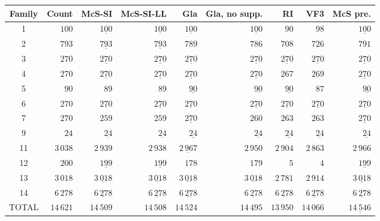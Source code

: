 
\begin{tabular}{crrrrrrrr}
    \toprule
    Family & Count & McS-SI & McS-SI-LL & Gla & Gla, no supp. & RI & VF3 & McS pre.\\
    \midrule

1 & $100$ & $\underline{100}$ & $\underline{100}$ & $\underline{100}$ & $\underline{100}$ & $90$ & $98$ & $\underline{100}$\\
2 & $793$ & $\underline{793}$ & $\underline{793}$ & $789$ & $786$ & $708$ & $726$ & $791$\\
3 & $270$ & $\underline{270}$ & $\underline{270}$ & $\underline{270}$ & $\underline{270}$ & $\underline{270}$ & $\underline{270}$ & $\underline{270}$\\
4 & $270$ & $\underline{270}$ & $\underline{270}$ & $\underline{270}$ & $\underline{270}$ & $267$ & $269$ & $\underline{270}$\\
5 & $90$ & $89$ & $89$ & $\underline{90}$ & $\underline{90}$ & $\underline{90}$ & $87$ & $\underline{90}$\\
6 & $270$ & $\underline{270}$ & $\underline{270}$ & $\underline{270}$ & $\underline{270}$ & $\underline{270}$ & $\underline{270}$ & $\underline{270}$\\
7 & $270$ & $259$ & $259$ & $\underline{270}$ & $260$ & $263$ & $263$ & $\underline{270}$\\
9 & $24$ & $\underline{24}$ & $\underline{24}$ & $\underline{24}$ & $\underline{24}$ & $\underline{24}$ & $\underline{24}$ & $\underline{24}$\\
11 & $3\,038$ & $2\,939$ & $2\,938$ & $\underline{2\,967}$ & $2\,950$ & $2\,904$ & $2\,863$ & $2\,966$\\
12 & $200$ & $\underline{199}$ & $\underline{199}$ & $178$ & $179$ & $5$ & $4$ & $\underline{199}$\\
13 & $3\,018$ & $\underline{3\,018}$ & $\underline{3\,018}$ & $\underline{3\,018}$ & $\underline{3\,018}$ & $2\,781$ & $2\,914$ & $\underline{3\,018}$\\
14 & $6\,278$ & $\underline{6\,278}$ & $\underline{6\,278}$ & $\underline{6\,278}$ & $\underline{6\,278}$ & $\underline{6\,278}$ & $\underline{6\,278}$ & $\underline{6\,278}$\\
TOTAL & $14\,621$ & $14\,509$ & $14\,508$ & $14\,524$ & $14\,495$ & $13\,950$ & $14\,066$ & $\underline{14\,546}$\\

    \bottomrule
\end{tabular}

